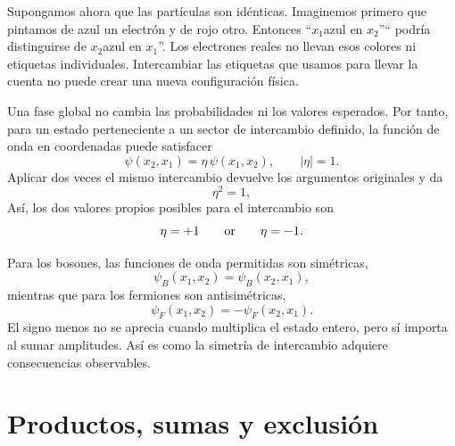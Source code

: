 Supongamos ahora que las partículas son idénticas. Imaginemos primero que pintamos de azul un electrón y de rojo otro. Entonces ``\(x_1\)azul en \(x_2\)''`` podría distinguirse de \(x_2\)azul en \(x_1\)''. Los electrones reales no llevan esos colores ni etiquetas individuales. Intercambiar las etiquetas que usamos para llevar la cuenta no puede crear una nueva configuración física.

Una fase global no cambia las probabilidades ni los valores esperados. Por tanto, para un estado perteneciente a un sector de intercambio definido, la función de onda en coordenadas puede satisfacer
\begin{equation}
\psi(x_2,x_1)=\eta\,\psi(x_1,x_2),
\qquad
\lvert\eta\rvert=1.
\end{equation}
Aplicar dos veces el mismo intercambio devuelve los argumentos originales y da
\begin{equation}
\eta^2=1,
\end{equation}
Así, los dos valores propios posibles para el intercambio son
\begin{equation}
\eta=+1
\qquad\hbox{or}\qquad
\eta=-1.
\end{equation}


Para los bosones, las funciones de onda permitidas son simétricas,
\begin{equation}
\psi_B(x_1,x_2)=\psi_B(x_2,x_1),
\end{equation}
mientras que para los fermiones son antisimétricas,
\begin{equation}
\psi_F(x_1,x_2)=-\psi_F(x_2,x_1).
\end{equation}
El signo menos no se aprecia cuando multiplica el estado entero, pero sí importa al sumar amplitudes. Así es como la simetría de intercambio adquiere consecuencias observables.

\section{Productos, sumas y exclusión}

